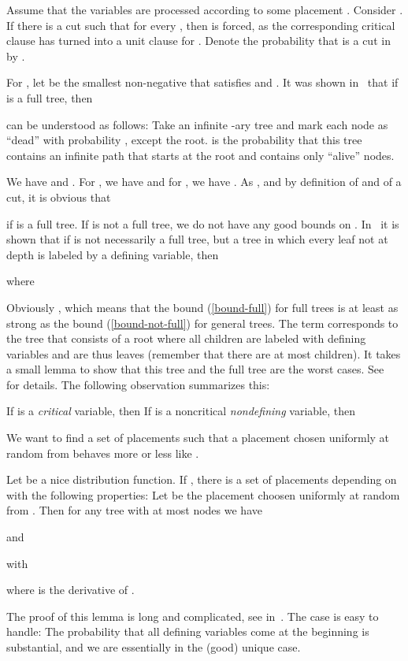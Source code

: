 Assume that the variables are processed according to some placement
. Consider . If there is a cut  such that  for every , 
then  is forced, as the
corresponding critical clause has turned into a unit clause for .
Denote the probability that  is a cut in  by
.

For , let  be the smallest non-negative  that
satisfies  and . It was
shown in~\cite{ppsz} that if  is a full tree, then

 can be understood as follows: Take an infinite -ary tree and mark each node as ``dead'' with probability , except the root.  is the probability that this tree contains an infinite path that starts at the root and contains only ``alive'' nodes.

We have  and . For , we have  and for , we have . 
As , and by definition of  and of a cut, it is obvious that

 if  is a full tree.  If 
is not a full tree, we do not have any good bounds on .
In~\cite{rolf2006} it is shown that if  is not necessarily a full
tree, but a tree in which every leaf not at depth  is labeled by a
defining variable, then

where

Obviously , which means that the bound
(\ref{bound-full}) for full trees is at least as strong as the bound
(\ref{bound-not-full}) for general trees. The  term
corresponds to the tree that consists of a root where all
children are labeled with defining variables and are thus leaves
(remember that there are at most  children).  It takes a small
lemma to show that this tree and the full tree are the worst cases.
See~\cite{thesis} for details.  The following observation summarizes
this:
\begin{observation}
\label{p.o.trees}
If  is a \emph{critical} variable, then  If  is a noncritical \emph{nondefining} variable, then

\end{observation}
We want to find a set  of placements such that a placement
chosen uniformly at random from  behaves more or less like
.
\begin{lemma}
\label{p.l.Hlemma}
Let  be a nice distribution function. If ,
there is a set of placements  depending on  with the
following properties: Let  be the placement choosen
uniformly at random from . Then for any tree  with at most
 nodes we have

and

with

where  is the derivative of .
\end{lemma}
The proof of this lemma is long and complicated, see 
in~\cite{thesis}. The case  is easy to handle:
The probability that all defining variables come at the beginning is substantial, and we are essentially in the
(good) unique case.  


